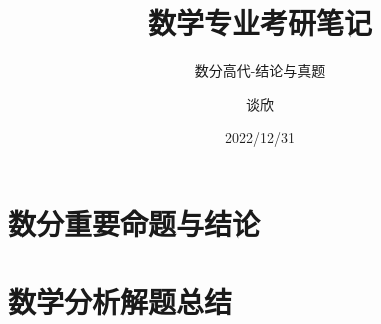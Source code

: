 \documentclass[lang=cn,newtx,12pt,scheme=chinese]{elegantbook}
\title{数学专业考研笔记}
\subtitle{数分高代-结论与真题}
\author{谈欣}
\institute{湖北第二师范学院数学与统计学院}
\date{2022/12/31}
\begin{document}
	
	\maketitle\frontmatter\tableofcontents\mainmatter
	
	\chapter{数分重要命题与结论}\newpage
	
	
	\newpage
	
	
	
	\newpage
	
	\newpage
	\newpage
	\newpage
	
	\newpage
	\newpage
	\newpage
	
	\newpage
	\newpage
	
	\newpage
	\newpage
	\newpage
	
	\newpage
	\newpage
	
	\newpage
	\newpage
	\newpage
	\newpage
	\newpage
	
	\newpage
	
	\newpage
	
	
	\chapter{数学分析解题总结}
	
	
	
	
	
\end{document}
